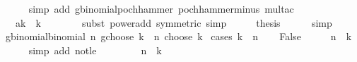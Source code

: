 \begin{isabellebody}
\ \ \ \ \isamarkupfalse%
\ {\isacharparenleft}{\kern0pt}simp\ add{\isacharcolon}{\kern0pt}\ gbinomial{\isacharunderscore}{\kern0pt}pochhammer\ pochhammer{\isacharunderscore}{\kern0pt}minus\ mult{\isacharunderscore}{\kern0pt}ac{\isacharparenright}{\kern0pt}\isanewline
\ \ \isamarkupfalse%
\ \isamarkupfalse%
\ {\isachardoublequoteopen}{\isacharparenleft}{\kern0pt}{\isacharminus}{\kern0pt}{}\ {\isacharcolon}{\kern0pt}{\isacharcolon}{\kern0pt}\ {\isacharprime}{\kern0pt}a{\isacharparenright}{\kern0pt}{\isacharcircum}{\kern0pt}k\ {\isacharasterisk}{\kern0pt}\ {\isacharparenleft}{\kern0pt}{\isacharminus}{\kern0pt}{}{\isacharparenright}{\kern0pt}{\isacharcircum}{\kern0pt}k\ {\isacharequal}{\kern0pt}\ {}{\isachardoublequoteclose}\isanewline
\ \ \ \ \isamarkupfalse%
\ {\isacharparenleft}{\kern0pt}subst\ power{\isacharunderscore}{\kern0pt}add\ {\isacharbrackleft}{\kern0pt}symmetric{\isacharbrackright}{\kern0pt}{\isacharparenright}{\kern0pt}\ simp\isanewline
\ \ \isamarkupfalse%
\ \isamarkupfalse%
\ {\isacharquery}{\kern0pt}thesis\isanewline
\ \ \ \ \isamarkupfalse%
\ simp\isanewline
{}\isamarkupfalse%
%
\endisatagproof
{\isafoldproof}%
%
\isadelimproof
\isanewline
%
\endisadelimproof
\isanewline
{}\isamarkupfalse%
\ gbinomial{\isacharunderscore}{\kern0pt}binomial{\isacharcolon}{\kern0pt}\ {\isachardoublequoteopen}n\ gchoose\ k\ {\isacharequal}{\kern0pt}\ n\ choose\ k{\isachardoublequoteclose}\isanewline
%
\isadelimproof
%
\endisadelimproof
%
\isatagproof
{}\isamarkupfalse%
\ {\isacharparenleft}{\kern0pt}cases\ {\isachardoublequoteopen}k\ {\isasymle}\ n{\isachardoublequoteclose}{\isacharparenright}{\kern0pt}\isanewline
\ \ \isamarkupfalse%
\ False\isanewline
\ \ \isamarkupfalse%
\ \isamarkupfalse%
\ {\isachardoublequoteopen}n\ {\isacharless}{\kern0pt}\ k{\isachardoublequoteclose}\isanewline
\ \ \ \ \isamarkupfalse%
\ {\isacharparenleft}{\kern0pt}simp\ add{\isacharcolon}{\kern0pt}\ not{\isacharunderscore}{\kern0pt}le{\isacharparenright}{\kern0pt}\isanewline
\ \ \isamarkupfalse%
\ \isamarkupfalse%
\ {\isachardoublequoteopen}{}\ {\isasymin}\ {\isacharparenleft}{\kern0pt}{\isacharparenleft}{\kern0pt}{\isacharminus}{\kern0pt}{\isacharparenright}{\kern0pt}\ n{\isacharparenright}{\kern0pt}\ {\isacharbackquote}{\kern0pt}\ {\isacharbraceleft}{\kern0pt}{}{\isachardot}{\kern0pt}{\isachardot}{\kern0pt}{\isacharless}{\kern0pt}k{\isacharbraceright}{\kern0pt}{\isachardoublequoteclose}\isanewline

\end{isabellebody}
